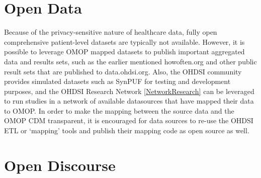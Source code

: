 \documentclass[11pt]{book}
\theoremstyle{definition}
\theoremstyle{definition}
\theoremstyle{definition}
\theoremstyle{remark}
\begin{document}
\hypertarget{open-data}{%
\section{Open Data}\label{open-data}}


Because of the privacy-sensitive nature of healthcare data, fully open comprehensive patient-level datasets are typically not available. However, it is possible to leverage OMOP mapped datasets to publish important aggregated data and results sets, such as the earlier mentioned howoften.org and other public result sets that are published to data.ohdsi.org. Also, the OHDSI community provides simulated datasets such as SynPUF for testing and development purposes, and the OHDSI Research Network \ref{NetworkResearch} can be leveraged to run studies in a network of available datasources that have mapped their data to OMOP. In order to make the mapping between the source data and the OMOP CDM transparent, it is encouraged for data sources to re-use the OHDSI ETL or `mapping' tools and publish their mapping code as open source as well.

\hypertarget{open-discourse}{%
\section{Open Discourse}\label{open-discourse}}

\end{document}
